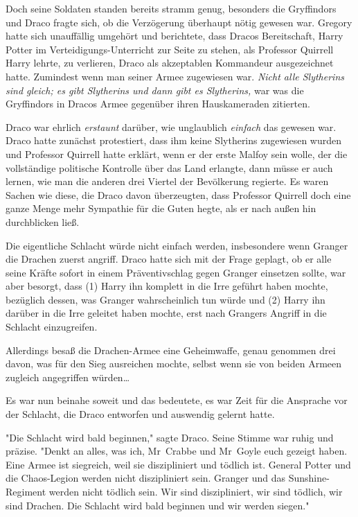 {Doch seine Soldaten standen bereits stramm genug, besonders die Gryffindors und Draco fragte sich, ob die Verzögerung überhaupt nötig gewesen war. Gregory hatte sich unauffällig umgehört und berichtete, dass Dracos Bereitschaft, Harry Potter im Verteidigungs-Unterricht zur Seite zu stehen, als Professor Quirrell Harry lehrte, zu verlieren, Draco als akzeptablen Kommandeur ausgezeichnet hatte. Zumindest wenn man seiner Armee zugewiesen war. \emph{Nicht alle Slytherins sind gleich; es gibt Slytherins und dann gibt es Slytherins,} war was die Gryffindors in Dracos Armee gegenüber ihren Hauskameraden zitierten.

Draco war ehrlich \emph{erstaunt} darüber, wie unglaublich \emph{einfach} das gewesen war. Draco hatte zunächst protestiert, dass ihm keine Slytherins zugewiesen wurden und Professor Quirrell hatte erklärt, wenn er der erste Malfoy sein wolle, der die vollständige politische Kontrolle über das Land erlangte, dann müsse er auch lernen, wie man die anderen drei Viertel der Bevölkerung regierte. Es waren Sachen wie diese, die Draco davon überzeugten, dass Professor Quirrell doch eine ganze Menge mehr Sympathie für die Guten hegte, als er nach außen hin durchblicken ließ.

Die eigentliche Schlacht würde nicht einfach werden, insbesondere wenn Granger die Drachen zuerst angriff. Draco hatte sich mit der Frage geplagt, ob er alle seine Kräfte sofort in einem Präventivschlag gegen Granger einsetzen sollte, war aber besorgt, dass (1) Harry ihn komplett in die Irre geführt haben mochte, bezüglich dessen, was Granger wahrscheinlich tun würde und (2) Harry ihn darüber in die Irre geleitet haben mochte, erst nach Grangers Angriff in die Schlacht einzugreifen.

Allerdings besaß die Drachen-Armee eine Geheimwaffe, genau genommen drei davon, was für den Sieg ausreichen mochte, selbst wenn sie von beiden Armeen zugleich angegriffen würden…

Es war nun beinahe soweit und das bedeutete, es war Zeit für die Ansprache vor der Schlacht, die Draco entworfen und auswendig gelernt hatte.

"Die Schlacht wird bald beginnen," sagte Draco. Seine Stimme war ruhig und präzise. "Denkt an alles, was ich, Mr~Crabbe und Mr~Goyle euch gezeigt haben. Eine Armee ist siegreich, weil sie diszipliniert und tödlich ist. General Potter und die Chaos-Legion werden nicht diszipliniert sein. Granger und das Sunshine-Regiment werden nicht tödlich sein. Wir sind diszipliniert, wir sind tödlich, wir sind Drachen. Die Schlacht wird bald beginnen und wir werden siegen."

}
